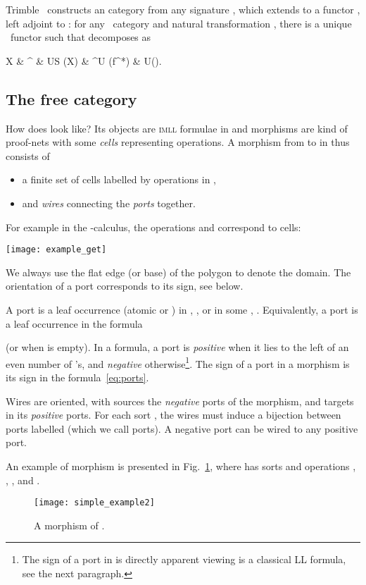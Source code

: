\documentclass{llncs}
\newcommand{\C}{\mathcal{C}}
\newcommand{\imll}{\textsc{imll}}
\begin{document}
Trimble~\cite{Trimble:phd} constructs an \smc{} category 
from any signature , which extends to a functor , left adjoint to : for any \smc\ category  and natural
transformation , there is a unique \smc\
functor  such that  decomposes as
\begin{diagram}[inline]
  X & \rTo^{\eta} & US (X) & \rTo^{U (f^*)} & U(\C).
\end{diagram}

\subsection{The free \smc{} category}
How does  look like?  Its objects are \imll{} formulae in
 and morphisms are kind of proof-nets with some
\emph{cells} representing operations.  A morphism from  to  in
 thus consists of
\begin{itemize}
\item a finite set  of cells labelled by
  operations  in ,
    \item and \emph{wires} connecting the \emph{ports} together.
\end{itemize}
For example in the -calculus, the operations  and
 correspond to cells:
\begin{center}
\texttt{[image: example\_get]}
\end{center}
We always use the flat edge (or base) of the polygon to denote the domain. 
The orientation of a port corresponds to its sign, see below. 

A port is a leaf occurrence (atomic or ) in , , or in some
, .
Equivalently, a port is a leaf occurrence in the formula

(or  when  is empty).
In a formula, a port is \emph{positive} when it lies to the left of an even
number of 's, and \emph{negative} otherwise\footnote{The sign of a port
in  is directly apparent viewing  is a classical LL formula, see the next
paragraph.}.
The sign of a port in a morphism is its sign in the formula~\eqref{eq:ports}.

Wires are oriented, with sources the \emph{negative} ports of the
morphism, and targets in its \emph{positive} ports.  For each sort , the wires must induce a bijection between ports labelled 
(which we call  ports).  A negative  port can be wired to any
positive port.

An example of morphism is presented in Fig.~\ref{freesig:example:ii}, where
 has sorts  and operations , , ,  and .
\begin{figure}[ht] \centering
    \texttt{[image: simple\_example2]}
    \caption{A morphism of .}
    \label{freesig:example:ii}
\end{figure}
\end{document}
